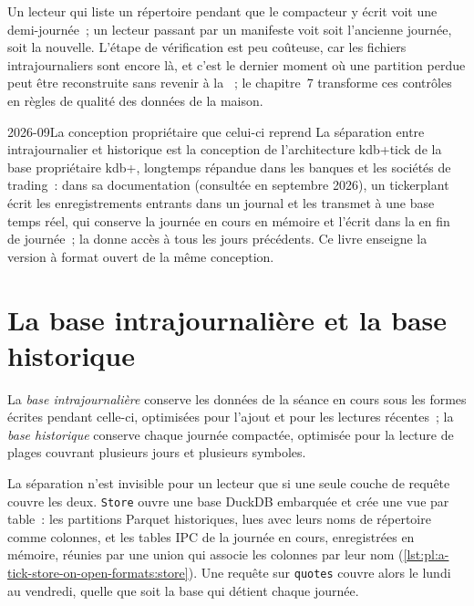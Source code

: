 Un lecteur qui liste un répertoire pendant que le compacteur y écrit voit une demi-journée~; un lecteur passant par un manifeste voit soit l'ancienne
journée, soit la nouvelle. L'étape de vérification est peu coûteuse, car les fichiers intrajournaliers sont encore là, et c'est le dernier moment
où une partition perdue peut être reconstruite sans revenir à la ~; le chapitre~7 transforme ces contrôles en règles de qualité
des données de la maison.

\begin{dated}{2026-09}{La conception propriétaire que celui-ci reprend}\label{dat:pl:a-tick-store-on-open-formats:kdb}
La séparation entre intrajournalier et historique est la conception de l'architecture kdb+tick de la base propriétaire kdb+, longtemps répandue dans les banques
et les sociétés de trading~: dans sa documentation (consultée en septembre 2026), un tickerplant écrit les enregistrements entrants dans un journal et les
transmet à une base temps réel, qui conserve la journée en cours en mémoire et l'écrit dans la  en fin de journée~; la 
donne accès à tous les jours précédents. Ce livre enseigne la version à format ouvert de la même conception.
\end{dated}

\section{La base intrajournalière et la base historique}

\begin{definition}\label{def:pl:a-tick-store-on-open-formats:split}
La \emph{base intrajournalière} conserve les données de la séance en cours sous les formes écrites pendant celle-ci, optimisées pour
l'ajout et pour les lectures récentes~; la \emph{base historique} conserve chaque journée compactée, optimisée pour
la lecture de plages couvrant plusieurs jours et plusieurs symboles.
\end{definition}

La séparation n'est invisible pour un lecteur que si une seule couche de requête couvre les deux. \texttt{Store} ouvre une base DuckDB embarquée et crée une
vue par table~: les partitions Parquet historiques, lues avec leurs noms de répertoire comme colonnes, et les tables IPC de la journée en cours,
enregistrées en mémoire, réunies par une union qui associe les colonnes par leur nom (\cref{lst:pl:a-tick-store-on-open-formats:store}). Une
requête sur \texttt{quotes} couvre alors le lundi au vendredi, quelle que soit la base qui détient chaque journée.

